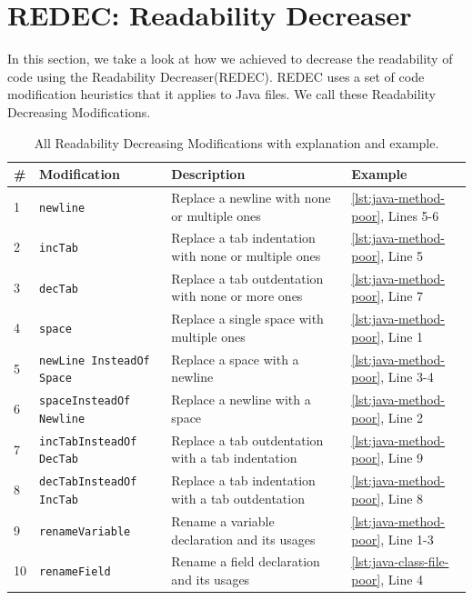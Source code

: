 \documentclass[%
class=scrreprt,
chapterprefix=false,%
open=right,%
twoside=true,%
paper=a4,%
logofile={Logo\_zentral\_farbig\_EN.png},%
thesistype=master,%
UKenglish,%
]{se2thesis}
\theoremstyle{definition}
\newcommand{\RDH}{Readability Decreaser\xspace}
\newcommand{\rdh}{REDEC\xspace}
\newcommand{\RDHa}{\RDH (\rdh)\xspace} %
\newcommand{\RDMs}{Readability Decreasing Modifications\xspace}
\begin{document}
\section{REDEC: Readability Decreaser} \label{REDEC}
	In this section, we take a look at how we achieved to decrease the readability of code using the \RDHa.
	\rdh uses a set of code modification heuristics that it applies to Java files. We call these \RDMs.
	
	\begin{table}[p]
		\centering
		\caption{All \RDMs with explanation and example.}
		\label{tab:rdh-description}
		\begin{tabular}{|p{}|p{}|p{}|p{}|}
			\hline
			\textbf{\#} & \textbf{Modification} & \textbf{Description} & \textbf{Example} \\
			\hline
			1 & \texttt{newline} & Replace a newline with none or multiple ones & \autoref{lst:java-method-poor}, Lines 5-6 \\
			\hline
			2 & \texttt{incTab} & Replace a tab indentation with none or multiple ones & \autoref{lst:java-method-poor}, Line 5 \\
			\hline
			3 & \texttt{decTab} & Replace a tab outdentation with none or more ones & \autoref{lst:java-method-poor}, Line 7 \\
			\hline
			4 & \texttt{space} & Replace a single space with multiple ones & \autoref{lst:java-method-poor}, Line 1 \\
			\hline
			5 & \texttt{newLine InsteadOf Space} & Replace a space with a newline & \autoref{lst:java-method-poor}, Line 3-4 \\
			\hline
			6 & \texttt{spaceInsteadOf Newline} & Replace a newline with a space & \autoref{lst:java-method-poor}, Line 2 \\
			\hline
			7 & \texttt{incTabInsteadOf DecTab} & Replace a tab outdentation with a tab indentation & \autoref{lst:java-method-poor}, Line 9 \\
			\hline
			8 & \texttt{decTabInsteadOf IncTab} & Replace a tab indentation with a tab outdentation & \autoref{lst:java-method-poor}, Line 8 \\
			\hline
			9 & \texttt{renameVariable} & Rename a variable declaration and its usages & \autoref{lst:java-method-poor}, Line 1-3 \\
			\hline
			10 & \texttt{renameField} & Rename a field declaration and its usages & \autoref{lst:java-class-file-poor}, Line 4 \\

\end{tabular}
\end{table}
\end{document}
